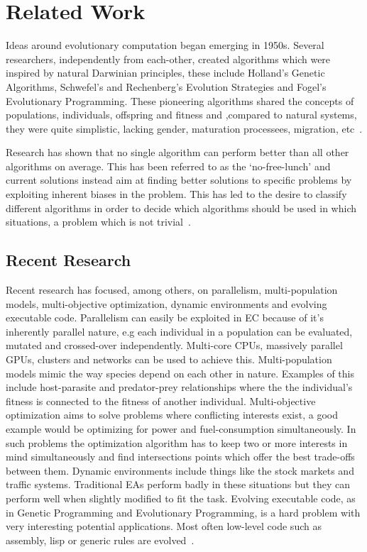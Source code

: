 \section{Related Work}

Ideas around evolutionary computation began emerging in 1950s. Several researchers, independently from each-other, created algorithms which were inspired by natural Darwinian principles, these include Holland's Genetic Algorithms, Schwefel's and Rechenberg's Evolution Strategies and Fogel's Evolutionary Programming. These pioneering algorithms shared the concepts of populations, individuals, offspring and fitness and ,compared to natural systems, they were quite simplistic, lacking gender, maturation processees, migration, etc~\cite{dejong2009EC}.

Research has shown that no single algorithm can perform better than all other algorithms on average. This has been referred to as the `no-free-lunch' and current solutions instead aim at finding better solutions to specific problems by exploiting inherent biases in the problem. This has led to the desire to classify different algorithms in order to decide which algorithms should be used in which situations, a problem which is not trivial~\cite{dejong2009EC}.

\subsection{Recent Research}

Recent research has focused, among others, on parallelism, multi-population models, multi-objective optimization, dynamic environments and evolving executable code. Parallelism can easily be exploited in EC because of it's inherently parallel nature, e.g each individual in a population can be evaluated, mutated and crossed-over independently. Multi-core CPUs, massively parallel GPUs, clusters and networks can be used to achieve this. Multi-population models mimic the way species depend on each other in nature. Examples of this include host-parasite and predator-prey relationships where the the individual's fitness is connected to the fitness of another individual. Multi-objective optimization aims to solve problems where conflicting interests exist, a good example would be optimizing for power and fuel-consumption simultaneously. In such problems the optimization algorithm has to keep two or more interests in mind simultaneously and find intersections points which offer the best trade-offs between them. Dynamic environments include things like the stock markets and traffic systems. Traditional EAs perform badly in these situations but they can perform well when slightly modified to fit the task. Evolving executable code, as in Genetic Programming and Evolutionary Programming, is a hard problem with very interesting potential applications. Most often low-level code such as assembly, lisp or generic rules are evolved~\cite{dejong2009EC}.

